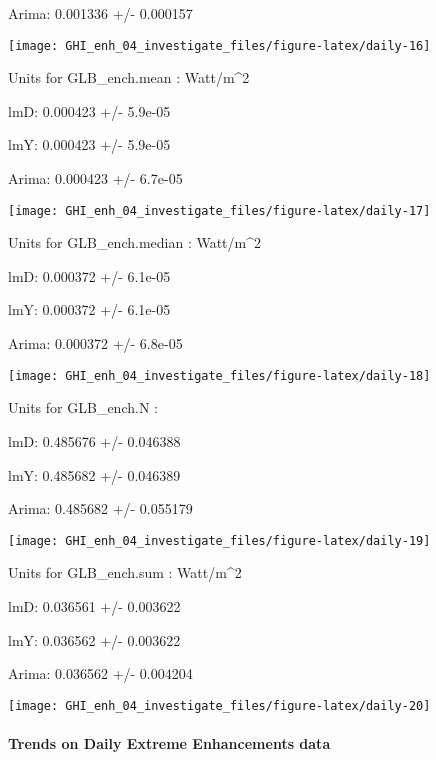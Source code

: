 \documentclass[
  10pt,
  a4paper,oneside]{article}
\begin{document}
Arima: 0.001336 +/- 0.000157

\begin{center}\texttt{[image: GHI\_enh\_04\_investigate\_files/figure-latex/daily-16]} \end{center}

Units for GLB\_ench.mean : Watt/m\^{}2

lmD: 0.000423 +/- 5.9e-05

lmY: 0.000423 +/- 5.9e-05

Arima: 0.000423 +/- 6.7e-05

\begin{center}\texttt{[image: GHI\_enh\_04\_investigate\_files/figure-latex/daily-17]} \end{center}

Units for GLB\_ench.median : Watt/m\^{}2

lmD: 0.000372 +/- 6.1e-05

lmY: 0.000372 +/- 6.1e-05

Arima: 0.000372 +/- 6.8e-05

\begin{center}\texttt{[image: GHI\_enh\_04\_investigate\_files/figure-latex/daily-18]} \end{center}

Units for GLB\_ench.N :

lmD: 0.485676 +/- 0.046388

lmY: 0.485682 +/- 0.046389

Arima: 0.485682 +/- 0.055179

\begin{center}\texttt{[image: GHI\_enh\_04\_investigate\_files/figure-latex/daily-19]} \end{center}

Units for GLB\_ench.sum : Watt/m\^{}2

lmD: 0.036561 +/- 0.003622

lmY: 0.036562 +/- 0.003622

Arima: 0.036562 +/- 0.004204

\begin{center}\texttt{[image: GHI\_enh\_04\_investigate\_files/figure-latex/daily-20]} \end{center}

\newpage

\hypertarget{trends-on-daily-extreme-enhancements-data}{%
\paragraph{Trends on Daily Extreme Enhancements data}\label{trends-on-daily-extreme-enhancements-data}}
\end{document}
